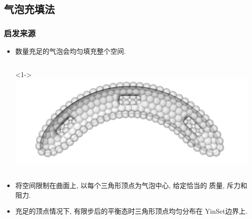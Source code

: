 \documentclass[UTF8]{ctexbeamer}	%
\theoremstyle{plain}
\theoremstyle{definition}
\theoremstyle{remark}
\numberwithin{equation}{section}
\begin{document}
\subsection{气泡充填法}
\begin{frame}
    \frametitle{启发来源}
    \begin{itemize}
        \item 数量充足的气泡会均匀填充整个空间.
        \begin{columns}
            <1->
            \includegraphics[width = \textwidth]{fig/bubble.png}
         \end{columns}
        \item 将空间限制在曲面上, 以每个三角形顶点为气泡中心, 给定恰当的
        质量, 斥力和阻力.

        \item 充足的顶点情况下, 有限步后的平衡态时三角形顶点均匀分布在
        YinSet边界上.
    \end{itemize}
\end{frame}
\end{document}
